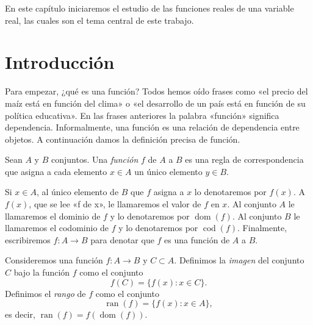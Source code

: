 \documentclass[12pt,a4paper]{book}
\DeclareMathOperator{\dom}{dom}
\DeclareMathOperator{\cod}{cod}
\DeclareMathOperator{\ran}{ran}
\begin{document}
    En este capítulo iniciaremos el estudio de las funciones reales de una variable
    real, las cuales son el tema central de este trabajo.

    \section{Introducción}

    Para empezar, ¿qué es una función? Todos hemos oído frases como «el
    precio del maíz está en función del clima» o «el desarrollo de un país está
    en función de su política educativa». En las frases anteriores la palabra
    «función» significa dependencia. Informalmente, una función es una relación
    de dependencia entre objetos. A continuación damos la definición precisa de
    función.

    \begin{definicion}[Función]\label{def:16}
        Sean $A$ y $B$ conjuntos. Una \textit{función} $f$ de $A$ a $B$
        es una regla de correspondencia que asigna a cada elemento $x\in A$ un único
        elemento $y\in B$.
    \end{definicion}

    Si $x\in A$, al único elemento de $B$ que $f$ asigna a $x$ lo denotaremos por
    $f(x)$. A $f(x)$, que se lee «f de x», le llamaremos el valor de $f$ en $x$. Al
    conjunto $A$ le llamaremos el dominio de $f$ y lo denotaremos por $\dom(f)$. Al
    conjunto $B$ le llamaremos el codominio de $f$ y lo denotaremos por $\cod(f)$.
    Finalmente, escribiremos $f:A\to B$ para denotar que $f$ es una función de $A$
    a $B$.

    \begin{definicion}\label{def:17}
        Consideremos una función
        $f:A\to B$ y $C\subset A$. Definimos la \textit{imagen} del conjunto $C$ bajo la función
        $f$ como el conjunto
        \begin{equation*}
            f(C)=\{f(x):x\in C\}.
        \end{equation*}
        Definimos el \textit{rango} de $f$ como el conjunto
        \begin{equation*}
            \ran(f)=\{f(x):x\in A\},
        \end{equation*}
        es decir, $\ran(f)=f(\dom(f))$.
    \end{definicion}
\end{document}
